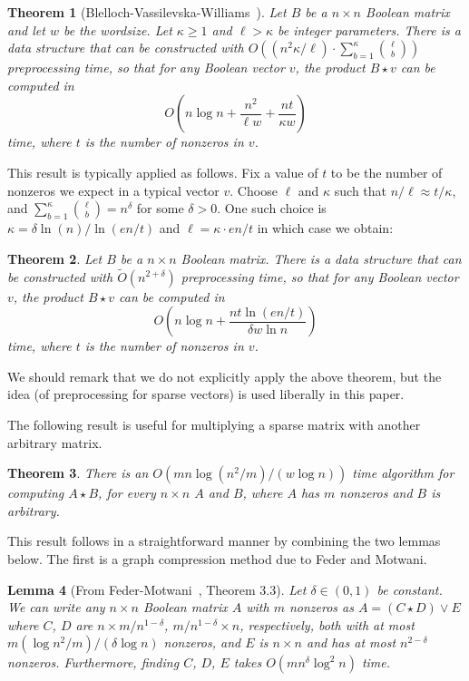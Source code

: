 \documentclass[10pt]{article}
\newtheorem{theorem}{Theorem}[section]
\newtheorem{lemma}[theorem]{Lemma}
\theoremstyle{definition}
\numberwithin{equation}{section}
\begin{document}
\begin{theorem}[Blelloch-Vassilevska-Williams~\cite{ICALP08}] \label{processforsparse}
Let $B$ be a $n \times n$ Boolean matrix and let $w$ be the wordsize. Let $\kappa \geq 1$ and $\ell > \kappa$ be integer parameters. There is a data structure that can be constructed with $O((n^2 \kappa / \ell) \cdot \sum_{b=1}^{\kappa} \binom{\ell}{b})$ preprocessing time, so that for any Boolean vector $v$, the product $B \star v$ can be computed  in 
\[
O\left(n \log n + \frac{n^2}{\ell w} + \frac{n t}{\kappa w}\right)
\]
time, where $t$ is the number of nonzeros in $v$.
\end{theorem}

This result is typically applied as follows. Fix a value of $t$ to be the number of nonzeros we expect in a typical vector $v$. Choose $\ell$ and $\kappa$ such that $n/\ell \approx t/\kappa$, and $\sum_{b=1}^{\kappa} \binom{\ell}{b} = n^\delta$ for some $\delta > 0$. One such choice is $\kappa = \delta \ln(n)/\ln(en/t)$ and $\ell = \kappa \cdot en/t$ in which case we obtain:

\begin{theorem}
Let $B$ be a $n \times n$ Boolean matrix.  There is a data structure that can be constructed with $\tilde{O}(n^{2+\delta})$ preprocessing time, so that for any Boolean vector $v$, the product $B \star v$ can be computed in 
$$
O\left(n \log n + \frac{n t \ln(en/t)}{\delta w \ln n }\right)
$$
time, where $t$ is the number of nonzeros in $v$.
\end{theorem}

We should remark that we do not explicitly apply the above theorem, but the idea (of preprocessing for sparse vectors) is used liberally in this paper.

The following result is useful for multiplying a sparse matrix with another arbitrary matrix.
\begin{theorem}\label{sparsemm} There is an $O(m n \log(n^2/m)/(w\log n))$ time algorithm for computing $A \star B$, for every $n\times n$ $A$ and $B$, where $A$ has $m$ nonzeros and $B$ is arbitrary.
\end{theorem}
This result follows in a straightforward manner by combining the two lemmas below.
The first is a graph compression method due to Feder and Motwani.

\begin{lemma}[From Feder-Motwani~\cite{federmotwani}, Theorem 3.3]\label{sparseramsey} Let $\delta \in (0,1)$ be constant. We can write any $n \times n$ Boolean matrix $A$ with $m$ nonzeros as $A = (C \star D) \vee E$ where $C$, $D$ are $n \times m/n^{1-\delta}$, $m/n^{1-\delta} \times n$, respectively, both with at most $m (\log n^2/m)/(\delta \log n)$ nonzeros, and $E$ is $n \times n$ and has at most $n^{2-\delta}$ nonzeros. Furthermore, finding $C$, $D$, $E$ takes $O(mn^{\delta}\log^2 n)$ time.\end{lemma}
\end{document}
